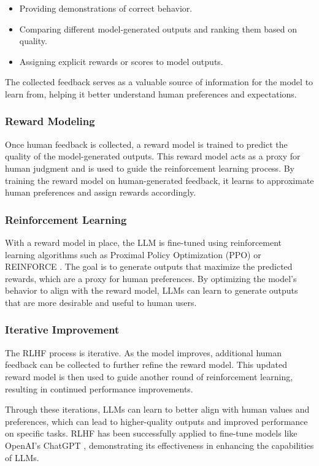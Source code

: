 \begin{itemize}
    \item Providing demonstrations of correct behavior.
    \item Comparing different model-generated outputs and ranking them based on quality.
    \item Assigning explicit rewards or scores to model outputs.
\end{itemize}

The collected feedback serves as a valuable source of information for the model to learn from, helping it better understand human preferences and expectations.

\subsubsection*{Reward Modeling}

Once human feedback is collected, a reward model is trained to predict the quality of the model-generated outputs. This reward model acts as a proxy for human judgment and is used to guide the reinforcement learning process. By training the reward model on human-generated feedback, it learns to approximate human preferences and assign rewards accordingly.

\subsubsection*{Reinforcement Learning}

With a reward model in place, the LLM is fine-tuned using reinforcement learning algorithms such as Proximal Policy Optimization (PPO) \cite{schulman2017proximal} or REINFORCE \cite{ahmadian2024basics}. The goal is to generate outputs that maximize the predicted rewards, which are a proxy for human preferences. By optimizing the model's behavior to align with the reward model, LLMs can learn to generate outputs that are more desirable and useful to human users.

\subsubsection*{Iterative Improvement}

The RLHF process is iterative. As the model improves, additional human feedback can be collected to further refine the reward model. This updated reward model is then used to guide another round of reinforcement learning, resulting in continued performance improvements.

Through these iterations, LLMs can learn to better align with human values and preferences, which can lead to higher-quality outputs and improved performance on specific tasks. RLHF has been successfully applied to fine-tune models like OpenAI's ChatGPT \cite{ouyang2022training}, demonstrating its effectiveness in enhancing the capabilities of LLMs.